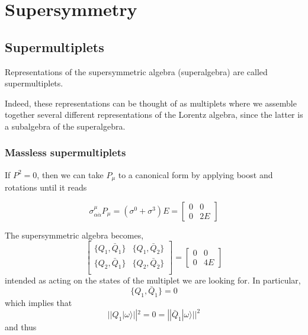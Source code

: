 \chapter{Supersymmetry}
\adjustmtc
\minitoc
\section{Supermultiplets}

\begin{definition}[Supermultiplet]
  Representations of the supersymmetric algebra (superalgebra) are called
  supermultiplets.
\end{definition}

Indeed, these representations can be thought of as multiplets where we assemble
together several different representations of the Lorentz algebra, since the
latter is a subalgebra of the superalgebra.

\subsection{Massless supermultiplets}
If $P^2=0$, then we can take $P_\mu$ to a canonical form by applying boost and
rotations until it reads

\begin{equation}
  \sigma^{\mu}_{\alpha\dot{\alpha}}P_\mu = \left(\sigma^0+\sigma^3\right)E = 
  \begin{bmatrix}
    0 & 0\\
    0 & 2E
  \end{bmatrix}
\end{equation}

The supersymmetric algebra becomes,
\begin{equation}
  \begin{bmatrix}
    \{Q_1,\bar{Q}_{\dot{1}}\} & \{Q_1,\bar{Q}_{\dot{2}}\} \\

    \{Q_2,\bar{Q}_{\dot{1}}\} & \{Q_2,\bar{Q}_{\dot{2}}\} \\

  \end{bmatrix}
  =
  \begin{bmatrix}
    0 & 0\\
    0 & 4E
  \end{bmatrix}
\end{equation}
intended as acting on the states of the multiplet we are looking for. In
particular,
\begin{equation}
\{Q_1, \bar{Q}_{\dot{1}}\} = 0
\end{equation}
which implies that 
\begin{equation}
  ||Q_1|\omega\rangle||^2 = 0 = ||\bar{Q}_{\dot{1}}|\omega\rangle||^2
\end{equation}
and thus

